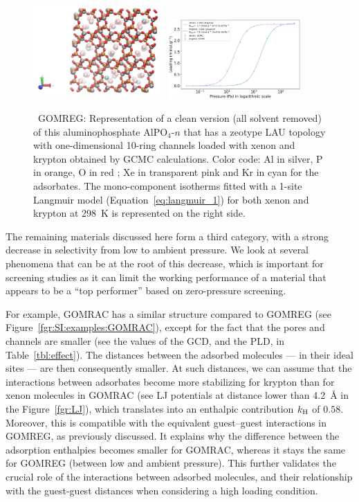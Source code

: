 \documentclass[main.tex]{subfiles}
\begin{document}
\begin{figure}[h]
  \centering
    \includegraphics[width=0.45\textwidth]{figures/2-thermo/GOMREG_clean.jpg}
    \includegraphics[width=0.45\textwidth]{figures/2-thermo/GOMREG_clean_isotherm_xenon_krypton_298K.jpg}
    \caption{\ GOMREG: Representation of a clean version (all solvent removed) of this aluminophosphate AlPO$_4$-$n$ that has a zeotype LAU topology with one-dimensional 10-ring channels loaded with xenon and krypton obtained by GCMC calculations. Color code: Al in silver, P in orange, O in red ; Xe in transparent pink and Kr in cyan for the adsorbates. The mono-component isotherms fitted with a 1-site Langmuir model (Equation~\ref{eq:langmuir_1}) for both xenon and krypton at \SI{298}{\kelvin} is represented on the right side.}
    \label{fgr:SI:examples:GOMREG}
  \end{figure}

The remaining materials discussed here form a third category, with a strong decrease in selectivity from low to ambient pressure. We look at several phenomena that can be at the root of this decrease, which is important for screening studies as it can limit the working performance of a material that appears to be a ``top performer'' based on zero-pressure screening.


For example, GOMRAC has a similar structure compared to GOMREG (see Figure~\ref{fgr:SI:examples:GOMRAC}), except for the fact that the pores and channels are smaller (see the values of the GCD, and the PLD, in Table~\ref{tbl:effect}). The distances between the adsorbed molecules --- in their ideal sites --- are then consequently smaller. At such distances, we can assume that the interactions between adsorbates become more stabilizing for krypton than for xenon molecules in GOMRAC (see LJ potentials at distance lower than \SI{4.2}{\angstrom} in the Figure~\ref{fgr:LJ}), which translates into an enthalpic contribution $k_{\text{H}}$ of $0.58$. Moreover, this is compatible with the equivalent guest--guest interactions in GOMREG, as previously discussed. It explains why the difference between the adsorption enthalpies becomes smaller for GOMRAC, whereas it stays the same for GOMREG (between low and ambient pressure). This further validates the crucial role of the interactions between adsorbed molecules, and their relationship with the guest-guest distances when considering a high loading condition.
\end{document}
